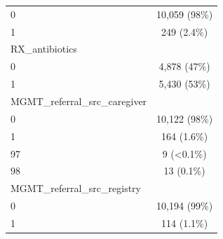 \documentclass[
  letterpaper,
  DIV=11,
  numbers=noendperiod,
  oneside]{scrreprt}
\begin{document}
\begin{longtable}[]{@{}lc@{}}
0 & 10,059 (98\%) \\
1 & 249 (2.4\%) \\
RX\_antibiotics & \\
0 & 4,878 (47\%) \\
1 & 5,430 (53\%) \\
MGMT\_referral\_src\_caregiver & \\
0 & 10,122 (98\%) \\
1 & 164 (1.6\%) \\
97 & 9 (\textless0.1\%) \\
98 & 13 (0.1\%) \\
MGMT\_referral\_src\_registry & \\
0 & 10,194 (99\%) \\
1 & 114 (1.1\%) \\
\end{longtable}
\end{document}
